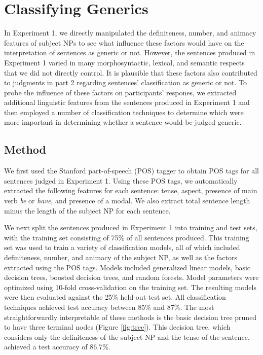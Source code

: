 \documentclass[10pt,letterpaper]{article}
\begin{document}
\section{Classifying Generics}

In Experiment 1, we directly manipulated the definiteness, number, and animacy features of subject NPs to see what influence these factors would have on the interpretation of sentences as generic or not. However, the sentences produced in Experiment 1 varied in many morphosyntactic, lexical, and semantic respects that we did not directly control. It is plausible that these factors also contributed to judgments in part 2 regarding sentences' classification as generic or not. To probe the influence of these factors on participants' respones, we extracted additional linguistic features from the sentences produced in Experiment 1 and then employed a number of classification techniques to determine which were more important in determining whether a sentence would be judged generic.  

\subsection{Method}

We first used the Stanford part-of-speech (POS) tagger \cite{Toutanova:2003} to obtain POS tags for all sentences judged in Experiment 1. Using these POS tags, we automatically extracted the following features for each sentence: tense, aspect, presence of main verb \textit{be} or \textit{have}, and presence of a modal. We also extract total sentence length minus the length of the subject NP for each sentence.

We next split the sentences produced in Experiment 1 into training and test sets, with the training set consisting of 75\% of all sentences produced. This training set was used to train a variety of classification models, all of which included definiteness, number, and animacy of the subject NP, as well as the factors extracted using the POS tags. Models included generalized linear models, basic decision trees, boosted decision trees, and random forests. Model parameters were optimized using 10-fold cross-validation on the training set. The resulting models were then evaluated against the 25\% held-out test set. All classification techniques achieved test accuracy between 85\% and 87\%. The most straightforwardly interpretable of these methods is the basic decision tree pruned to have three terminal nodes (Figure \ref{fig:tree}). This decision tree, which considers only the definiteness of the subject NP and the tense of the sentence,  achieved a test accuracy of 86.7\%.
\end{document}
